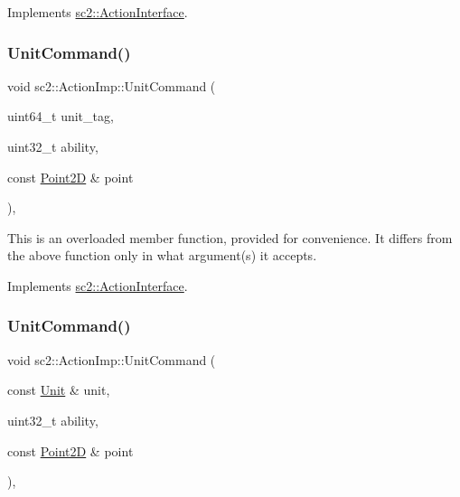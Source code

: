 Implements \hyperlink{classsc2_1_1_action_interface_acec9f59d4ec45fb47e420cf47e56da24}{sc2\+::\+Action\+Interface}.

\mbox{\label{classsc2_1_1_action_imp_ab4b1431197e8bf2339755756e30c3af2}} 
\subsubsection{\texorpdfstring{Unit\+Command()}{UnitCommand()}\hspace{0.1cm}{\footnotesize\ttfamily [3/6]}}
{\footnotesize\ttfamily void sc2\+::\+Action\+Imp\+::\+Unit\+Command (\begin{DoxyParamCaption}\item[{uint64\+\_\+t}]{unit\+\_\+tag,  }\item[{uint32\+\_\+t}]{ability,  }\item[{const \hyperlink{structsc2_1_1_point2_d}{Point2D} \&}]{point }\end{DoxyParamCaption})\hspace{0.3cm}{\ttfamily [override]}, {\ttfamily [virtual]}}

This is an overloaded member function, provided for convenience. It differs from the above function only in what argument(s) it accepts. 

Implements \hyperlink{classsc2_1_1_action_interface_a6f1e2d3904a5d7a71b93d43a8d21ee1a}{sc2\+::\+Action\+Interface}.

\mbox{\label{classsc2_1_1_action_imp_a1ba75d04c3771eee8f97f8ac03eaafc1}} 
\subsubsection{\texorpdfstring{Unit\+Command()}{UnitCommand()}\hspace{0.1cm}{\footnotesize\ttfamily [4/6]}}
{\footnotesize\ttfamily void sc2\+::\+Action\+Imp\+::\+Unit\+Command (\begin{DoxyParamCaption}\item[{const \hyperlink{classsc2_1_1_unit}{Unit} \&}]{unit,  }\item[{uint32\+\_\+t}]{ability,  }\item[{const \hyperlink{structsc2_1_1_point2_d}{Point2D} \&}]{point }\end{DoxyParamCaption})\hspace{0.3cm}{\ttfamily [override]}, {\ttfamily [virtual]}}

